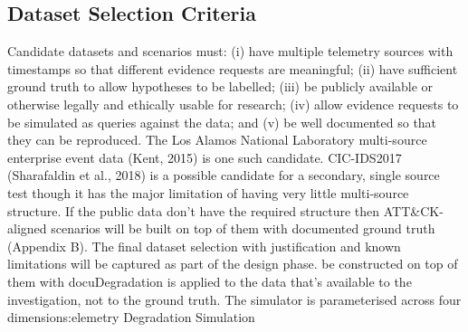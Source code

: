 \documentclass[a4paper,11pt]{article}
\begin{document}
\subsection{Dataset Selection Criteria}
Candidate datasets and scenarios must: (i) have multiple telemetry sources with timestamps so that different evidence requests are meaningful; (ii) have sufficient ground truth to allow hypotheses to be labelled; (iii) be publicly available or otherwise legally and ethically usable for research; (iv) allow evidence requests to be simulated as queries against the data; and (v) be well documented so that they can be reproduced. The Los Alamos National Laboratory multi-source enterprise event data (Kent, 2015) is one such candidate. CIC-IDS2017 (Sharafaldin et al., 2018) is a possible candidate for a secondary, single source test though it has the major limitation of having very little multi-source structure. If the public data don't have the required structure then ATT\&CK-aligned scenarios will be built on top of them with documented ground truth (Appendix B). The final dataset selection with justification and known limitations will be captured as part of the design phase. be constructed on top of them with docuDegradation is applied to the data that's available to the investigation, not to the ground truth. The simulator is parameterised across four dimensions:elemetry Degradation Simulation\par
\end{document}
